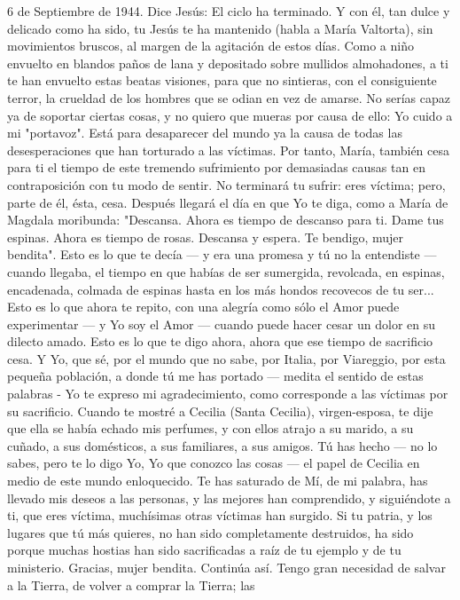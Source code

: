 \documentclass[12pt]{book} %
\begin{document}
 	6 de Septiembre de 1944. 
Dice Jesús:                             
El ciclo ha terminado. Y con él, tan dulce y delicado como ha sido, tu Jesús te ha mantenido (habla a María Valtorta), sin movimientos bruscos, al margen de la agitación de estos días. Como a niño envuelto en blandos paños de lana y depositado sobre mullidos almohadones, a ti te han envuelto estas beatas visiones, para que no sintieras, con el consiguiente terror, la crueldad de los hombres que se odian en vez de amarse. No serías capaz ya de soportar ciertas cosas, y no quiero que mueras por causa de ello: Yo cuido a mi "portavoz". 
Está para desaparecer del mundo ya la causa de todas las desesperaciones que han torturado a las víctimas. Por tanto, María, también cesa para ti el tiempo de este tremendo sufrimiento por demasiadas causas tan en contraposición con tu modo de sentir. No terminará tu sufrir: eres víctima; pero, parte de él, ésta, cesa. Después llegará el día en que Yo te diga, como a María de Magdala moribunda: "Descansa. Ahora es tiempo de descanso para ti. Dame tus espinas. Ahora es tiempo de rosas. Descansa y espera. Te bendigo, mujer bendita". 
Esto es lo que te decía — y era una promesa y tú no la entendiste — cuando llegaba, el tiempo en que habías de ser 
sumergida, revolcada, en espinas, encadenada, colmada de espinas hasta en los más hondos recovecos de tu ser... Esto es lo que ahora te repito, con una alegría como sólo el Amor puede experimentar — y Yo soy el Amor — cuando puede hacer cesar un dolor en su dilecto amado. Esto es lo que te digo ahora, ahora que ese tiempo de sacrificio cesa. Y Yo, que sé, por el mundo que no sabe, por Italia, por Viareggio, por esta pequeña población, a donde tú me has portado — medita el sentido de estas palabras - Yo te expreso mi agradecimiento, como corresponde a las víctimas por su sacrificio. 
Cuando te mostré a Cecilia (Santa Cecilia), virgen-esposa, te dije que ella se había echado mis perfumes, y con ellos 
atrajo a su marido, a su cuñado, a sus domésticos, a sus familiares, a sus amigos. Tú has hecho — no lo sabes, pero te lo digo Yo, Yo que conozco las cosas — el papel de Cecilia en medio de este mundo enloquecido. Te has saturado de Mí, de mi palabra, has llevado mis deseos a las personas, y las mejores han comprendido, y siguiéndote a ti, que eres víctima, muchísimas otras víctimas han surgido. Si tu patria, y los lugares que tú más quieres, no han sido completamente destruidos, ha sido porque muchas hostias han sido sacrificadas a raíz de tu ejemplo y de tu ministerio. 
Gracias, mujer bendita. Continúa así. Tengo gran necesidad de salvar a la Tierra, de volver a comprar la Tierra; las 
\end{document}
